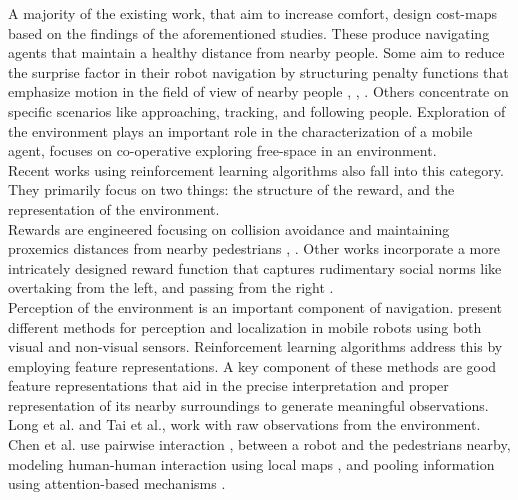 A majority of the existing work, that aim to increase comfort, design cost-maps based on the findings of the aforementioned studies. These produce navigating agents that maintain a healthy distance from nearby people. Some aim to reduce the surprise factor in their robot navigation by structuring penalty functions that emphasize motion in the field of view of nearby people \cite{pandey_2010_human_centered_nav}, \cite{scandolo_2011}, \cite{sisbot_human_2007}.
Others concentrate on specific scenarios like approaching, tracking, and following people. Exploration of the environment plays an important role in the characterization of a mobile agent, \cite{rekleitis2003experiments} focuses on co-operative exploring free-space in an environment.\\

Recent works using reinforcement learning algorithms also fall into this category. They primarily focus on two things: the structure of the reward, and the representation of the environment. \\

Rewards are engineered focusing on collision avoidance and maintaining proxemics distances from nearby pedestrians \cite{chen_crowd_aware_robot_nav_with_attention}, \cite{chen_decentralized_non_communication_2017}. Other works incorporate a more intricately designed reward function that captures rudimentary social norms like overtaking from the left,  and passing from the right \cite{chen_socially_2017}. \\

Perception of the environment is an important component of navigation. \cite{Dudek2000ComputationalPO} present different methods for perception and localization in mobile robots using both visual and non-visual sensors. Reinforcement learning algorithms address this by employing feature representations. A key component of these methods are good feature representations that aid in the precise interpretation and proper representation of its nearby surroundings to generate meaningful observations. Long et al. \cite{long_2017_optimally_decentralized_collision_avoidance} and Tai et al., \cite{tai_paolo_virtual_to_real_2017} work with raw observations from the environment. Chen et al. use pairwise interaction \cite{chen_crowd_aware_robot_nav_with_attention}, \cite{chen_decentralized_non_communication_2017} between a robot and the pedestrians nearby, modeling human-human interaction using local maps \cite{chen_crowd_aware_robot_nav_with_attention}, and pooling information using attention-based mechanisms \cite{chen_crowd_aware_robot_nav_with_attention}.

